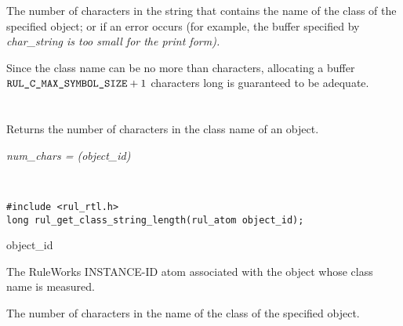 \ReturnValue

The number of characters in the string that contains the name of the
class of the specified object; or  if an
error occurs (for example, the buffer specified by \it{char\_string}
is too small for the print form).

Since the class name can be no more than 
characters, allocating a buffer $\texttt{RUL\_C\_MAX\_SYMBOL\_SIZE} + 1$ characters
long is guaranteed to be adequate.

\begin{seealso}


\end{seealso}

\section*{}

Returns the number of characters in the class name of an object.

\Syntax

\it{num\_chars} = (\it{object\_id})

\begin{args}
   \\
\end{args}

\CBinding
\begin{verbatim}
#include <rul_rtl.h>
long rul_get_class_string_length(rul_atom object_id);
\end{verbatim}

\begin{argument}
\item[object\_id]

  The RuleWorks INSTANCE-ID atom associated with the object whose
  class name is measured.
\end{argument}
        
\ReturnValue

The number of characters in the name of the class of the specified
object.

\begin{seealso}
\end{seealso}

